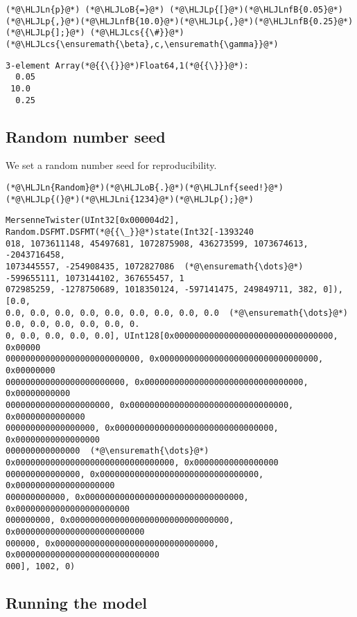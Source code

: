\documentclass[12pt,a4paper]{article}
\newcommand{\HLJLn}[1]{#1}
\newcommand{\HLJLnf}[1]{\textcolor[RGB]{66,102,213}{#1}}
\newcommand{\HLJLnfB}[1]{\textcolor[RGB]{59,151,46}{#1}}
\newcommand{\HLJLni}[1]{\textcolor[RGB]{59,151,46}{#1}}
\newcommand{\HLJLoB}[1]{\textcolor[RGB]{102,102,102}{\textbf{#1}}}
\newcommand{\HLJLp}[1]{#1}
\newcommand{\HLJLcs}[1]{\textcolor[RGB]{153,153,119}{\textit{#1}}}
\begin{document}
\begin{lstlisting}
(*@\HLJLn{p}@*) (*@\HLJLoB{=}@*) (*@\HLJLp{[}@*)(*@\HLJLnfB{0.05}@*)(*@\HLJLp{,}@*)(*@\HLJLnfB{10.0}@*)(*@\HLJLp{,}@*)(*@\HLJLnfB{0.25}@*)(*@\HLJLp{];}@*) (*@\HLJLcs{{\#}}@*) (*@\HLJLcs{\ensuremath{\beta},c,\ensuremath{\gamma}}@*)
\end{lstlisting}

\begin{lstlisting}
3-element Array(*@{{\{}}@*)Float64,1(*@{{\}}}@*):
  0.05
 10.0
  0.25
\end{lstlisting}


\subsection{Random number seed}
We set a random number seed for reproducibility.


\begin{lstlisting}
(*@\HLJLn{Random}@*)(*@\HLJLoB{.}@*)(*@\HLJLnf{seed!}@*)(*@\HLJLp{(}@*)(*@\HLJLni{1234}@*)(*@\HLJLp{);}@*)
\end{lstlisting}

\begin{lstlisting}
MersenneTwister(UInt32[0x000004d2], Random.DSFMT.DSFMT(*@{{\_}}@*)state(Int32[-1393240
018, 1073611148, 45497681, 1072875908, 436273599, 1073674613, -2043716458, 
1073445557, -254908435, 1072827086  (*@\ensuremath{\dots}@*)  -599655111, 1073144102, 367655457, 1
072985259, -1278750689, 1018350124, -597141475, 249849711, 382, 0]), [0.0, 
0.0, 0.0, 0.0, 0.0, 0.0, 0.0, 0.0, 0.0, 0.0  (*@\ensuremath{\dots}@*)  0.0, 0.0, 0.0, 0.0, 0.0, 0.
0, 0.0, 0.0, 0.0, 0.0], UInt128[0x00000000000000000000000000000000, 0x00000
000000000000000000000000000, 0x00000000000000000000000000000000, 0x00000000
000000000000000000000000, 0x00000000000000000000000000000000, 0x00000000000
000000000000000000000, 0x00000000000000000000000000000000, 0x00000000000000
000000000000000000, 0x00000000000000000000000000000000, 0x00000000000000000
000000000000000  (*@\ensuremath{\dots}@*)  0x00000000000000000000000000000000, 0x00000000000000000
000000000000000, 0x00000000000000000000000000000000, 0x00000000000000000000
000000000000, 0x00000000000000000000000000000000, 0x00000000000000000000000
000000000, 0x00000000000000000000000000000000, 0x00000000000000000000000000
000000, 0x00000000000000000000000000000000, 0x00000000000000000000000000000
000], 1002, 0)
\end{lstlisting}


\subsection{Running the model}
\end{document}
